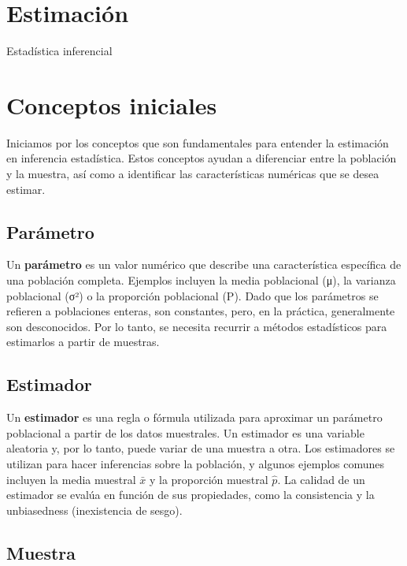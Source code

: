 \documentclass[
  letterpaper,
  DIV=11,
  numbers=noendperiod]{scrreprt}
\begin{document}
\chapter{Estimación}\label{estimaciuxf3n}

Estadística inferencial

\hfill\break

\chapter{Conceptos iniciales}\label{conceptos-iniciales}

Iniciamos por los conceptos que son fundamentales para entender la
estimación en inferencia estadística. Estos conceptos ayudan a
diferenciar entre la población y la muestra, así como a identificar las
características numéricas que se desea estimar.

\section{Parámetro}\label{paruxe1metro}

Un \textbf{parámetro} es un valor numérico que describe una
característica específica de una población completa. Ejemplos incluyen
la media poblacional (μ), la varianza poblacional (σ²) o la proporción
poblacional (P). Dado que los parámetros se refieren a poblaciones
enteras, son constantes, pero, en la práctica, generalmente son
desconocidos. Por lo tanto, se necesita recurrir a métodos estadísticos
para estimarlos a partir de muestras.

\section{Estimador}\label{estimador}

Un \textbf{estimador} es una regla o fórmula utilizada para aproximar un
parámetro poblacional a partir de los datos muestrales. Un estimador es
una variable aleatoria y, por lo tanto, puede variar de una muestra a
otra. Los estimadores se utilizan para hacer inferencias sobre la
población, y algunos ejemplos comunes incluyen la media muestral
\(\bar{x}\) y la proporción muestral \(\hat{p}\). La calidad de un
estimador se evalúa en función de sus propiedades, como la consistencia
y la unbiasedness (inexistencia de sesgo).

\section{Muestra}\label{muestra-1}
\end{document}
